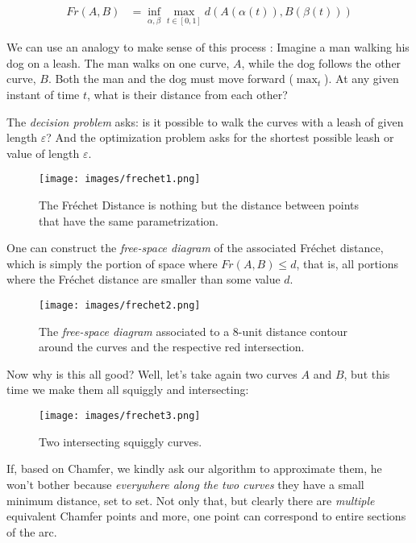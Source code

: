 \begin{align*}
    Fr(A,B) &= \inf_{\alpha, \beta} \max_{t\in[0,1]} d(A(\alpha(t)), B(\beta(t)))
\end{align*}

We can use an analogy to make sense of this process \cite{frechet2}:
Imagine a man walking his dog on a leash. The man walks on one curve, 
$A$, while the dog follows the other curve, $B$. Both the
man and the dog must move forward ($\max_t$). At any given
instant of time $t$, what is their distance from each other?



The \emph{decision problem} asks: is it possible to walk the curves 
with a leash of given length $\varepsilon$? And the optimization 
problem asks for the shortest possible leash or value of length $\varepsilon$.

\spa

\begin{figure}
    \centering
    \texttt{[image: images/frechet1.png]}
    \caption{The Fréchet Distance is nothing but the distance between
    points that have the same parametrization.}
\end{figure}

One can construct the \emph{free-space diagram} of the associated Fréchet
distance, which is simply the portion of space where $Fr(A,B)\le d$, that is,
all portions where the Fréchet distance are smaller than some value $d$.

\begin{figure}[h]
    \centering
    \texttt{[image: images/frechet2.png]}
    \caption{The \emph{free-space diagram} associated to a 
    8-unit distance contour around the curves and the respective
    red intersection.}
\end{figure}

Now why is this all good? Well, let's take again two curves $A$ and $B$,
but this time we make them all squiggly and intersecting:

\begin{figure}[h]
    \centering
    \texttt{[image: images/frechet3.png]}
    \caption{Two intersecting squiggly curves.}
    \label{fig:enter-label}
\end{figure}

If, based on Chamfer, we kindly ask our algorithm to approximate them, 
he won't bother because \emph{everywhere along the two curves} they have a small
minimum distance, set to set. Not only that, but clearly there are \emph{multiple}
equivalent Chamfer points and more, one point can correspond to entire sections
of the arc.

